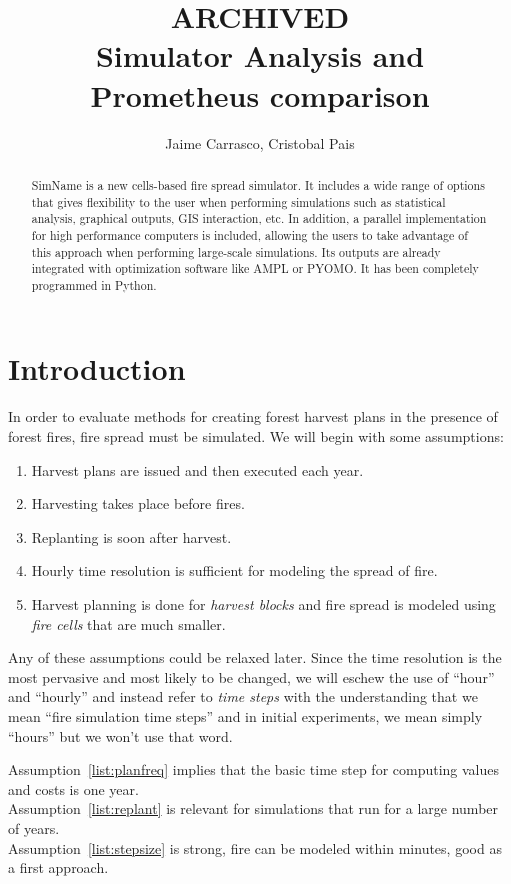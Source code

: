 \documentclass[11pt]{article}
\title{ARCHIVED \\Simulator Analysis and Prometheus comparison}
\author{Jaime Carrasco, Cristobal Pais}
\begin{document}
\maketitle

\begin{abstract}
SimName is a new cells-based fire spread simulator. It includes a wide range of options that gives flexibility to the user when performing simulations such as statistical analysis, graphical outputs, GIS interaction, etc. In addition, a parallel implementation for high performance computers is included, allowing the users to take advantage of this approach when performing large-scale simulations. Its outputs are already integrated with optimization software like AMPL or PYOMO. It has been completely programmed in Python.
\end{abstract}

\section{Introduction}

In order to evaluate methods for creating forest harvest plans in the presence of forest fires, fire spread must
be simulated.
We will begin with some assumptions:
\begin{enumerate}
	\item Harvest plans are issued and then executed each year. \label{list:planfreq}
	\item Harvesting takes place before fires.
	\item Replanting is soon after harvest. \label{list:replant}
	\item Hourly time resolution is sufficient for modeling the spread of fire. \label{list:stepsize}
	\item Harvest planning is done for {\em harvest blocks} and fire spread is modeled using {\em fire cells} that are much smaller.
\end{enumerate}

Any of these assumptions could be relaxed later. Since the time
resolution is the most pervasive and most likely to be changed, we
will eschew the use of ``hour'' and ``hourly'' and instead refer to
{\em time steps} with the understanding that we mean ``fire simulation time
steps'' and in initial experiments, we mean simply ``hours'' but we
won't use that word.


Assumption~\ref{list:planfreq} implies that the basic time
step for computing values and costs is one year. \\
Assumption~\ref{list:replant} is relevant for simulations that run for a large number of years.\\
Assumption~\ref{list:stepsize} is strong, fire can be modeled within minutes, good as a first approach.
\end{document}
